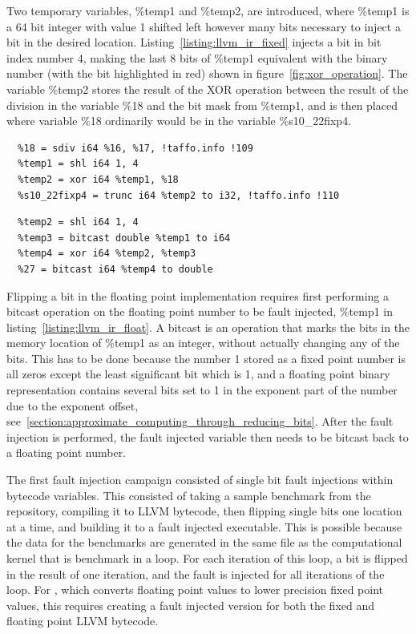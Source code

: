 Two temporary variables, \%temp1 and \%temp2, are introduced, where \%temp1 is a 64 bit integer with value 1 shifted left however many bits necessary to inject a bit in the desired location. Listing~\ref{listing:llvm_ir_fixed} injects a bit in bit index number 4, making the last 8 bits of \%temp1 equivalent with the binary number (with the bit highlighted in red) shown in figure~\ref{fig:xor_operation}.
The variable \%temp2 stores the result of the XOR operation between the result of the division in the variable \%18 and the bit mask from \%temp1, and is then placed where variable \%18 ordinarily would be in the variable \%s10\_22fixp4.

\begin{lstlisting}[caption=fixed point bit flip in LLVM bytecode, label=listing:llvm_ir_fixed]
  %17 = sext i32 %0 to i64, !taffo.info !45
  %18 = sdiv i64 %16, %17, !taffo.info !109
  %temp1 = shl i64 1, 4
  %temp2 = xor i64 %temp1, %18
  %s10_22fixp4 = trunc i64 %temp2 to i32, !taffo.info !110
\end{lstlisting} 

\begin{lstlisting}[caption=floating point bit flip in LLVM bytecode, label=listing:llvm_ir_float]
  %temp1 = fdiv double %24, %26
  %temp2 = shl i64 1, 4
  %temp3 = bitcast double %temp1 to i64
  %temp4 = xor i64 %temp2, %temp3
  %27 = bitcast i64 %temp4 to double
\end{lstlisting}

Flipping a bit in the floating point implementation requires first performing a bitcast operation on the floating point number to be fault injected, \%temp1 in listing~\ref{listing:llvm_ir_float}. A bitcast is an operation that marks the bits in the memory location of \%temp1 as an integer, without actually changing any of the bits. This has to be done because the number 1 stored as a fixed point number is all zeros except the least significant bit which is 1, and a floating point binary representation contains several bits set to 1 in the exponent part of the number due to the exponent offset, see~\ref{section:approximate_computing_through_reducing_bits}. After the fault injection is performed, the fault injected variable then needs to be bitcast back to a floating point number.

The first fault injection campaign consisted of single bit fault injections within bytecode variables. This consisted of taking a sample benchmark from the \taffo{} repository, compiling it to LLVM bytecode, then flipping single bits one location at a time, and building it to a fault injected executable. This is possible because the data for the benchmarks are generated in the same file as the computational kernel that is benchmark in a loop. For each iteration of this loop, a bit is flipped in the result of one iteration, and the fault is injected for all iterations of the loop. For \taffo{}, which converts floating point values to lower precision fixed point values, this requires creating a fault injected version for both the fixed and floating point LLVM bytecode.

